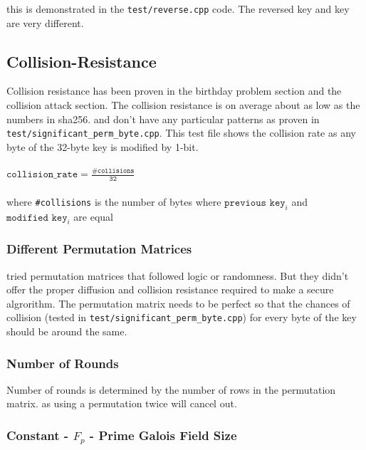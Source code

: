 \documentclass[fleqn, a4paper,12pt]{article}
\begin{document}
this is demonstrated in the \texttt{test/reverse.cpp} code. The reversed key and key are very different.

\subsection{Collision-Resistance}

Collision resistance has been proven in the birthday problem section and the collision attack section. The collision resistance is on average about as low as the numbers in sha256. and don't have any particular patterns as proven in \texttt{test/significant\_perm\_byte.cpp}. This test file shows the collision rate as any byte of the 32-byte key is modified by 1-bit.
\\\\
$\texttt{collision\_rate} = \frac{\texttt{\#collisions}}{\texttt{32}}$\\
 \\ where \texttt{\#collisions} is the number of bytes where $\texttt{previous key}_i$ and $\texttt{modified key}_i$ are equal

\subsubsection{Different Permutation Matrices}

tried permutation matrices that followed logic or randomness. But they didn't offer the proper diffusion and collision resistance required to make a secure algrorithm. The permutation matrix needs to be perfect so that the chances of collision (tested in \texttt{test/significant\_perm\_byte.cpp}) for every byte of the key should be around the same.

\subsubsection{Number of Rounds}

Number of rounds is determined by the number of rows in the permutation matrix. as using a permutation twice will cancel out.

\subsubsection{Constant - $F_p$ - Prime Galois Field Size}
\end{document}

